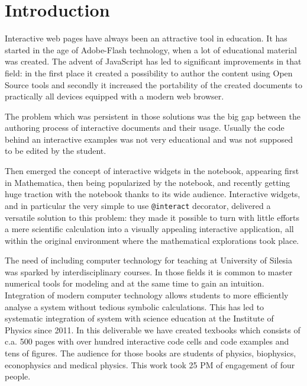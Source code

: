 \documentclass{deliverablereport}
\author{Marcin Kostur, Jerzy Łuczka, Jan Aksamit, Jolanta Marzec}
\begin{document}
\maketitle

\tableofcontents


\section{Introduction}

Interactive web pages have always been an attractive tool in
education. It has started in the age of Adobe-Flash technology, when a
lot of educational material was created. The advent of JavaScript has
led to significant improvements in that field: in the first place it
created a possibility to author the content using Open Source tools
and secondly it increased the portability of the created documents to
practically all devices equipped with a modern web browser.

The problem which was persistent in those solutions was the big gap
between the authoring process of interactive documents and their usage.
Usually the code behind an interactive examples was not very
educational and was not supposed to be edited by the student.

Then emerged the concept of interactive widgets in the notebook,
appearing first in Mathematica, then being popularized by the \Sage
notebook, and recently getting huge traction with the \Jupyter
notebook thanks to its wide audience. Interactive widgets, and in
particular the very simple to use \texttt{@interact} decorator,
delivered a versatile solution to this problem: they made it possible
to turn with little efforts a mere scientific calculation into a
visually appealing interactive application, all within the original
environment where the mathematical explorations took place.

The need of including computer technology for teaching at University
of Silesia was sparked by interdisciplinary courses. In those fields it
is common to master numerical tools for modeling and at the same time
to gain an intuition. Integration of modern computer technology allows
students to more efficiently analyse a system without tedious symbolic
calculations. This has led to systematic integration of \Sage system
with science education at the Institute of Physics since 2011. In this
deliverable we have created texbooks which consists of c.a.  500 pages
with over hundred interactive code cells and code examples and tens of
figures. The audience for those books are students of physics,
biophysics, econophysics and medical physics. This work took 25
PM of engagement of four people.
\end{document}
